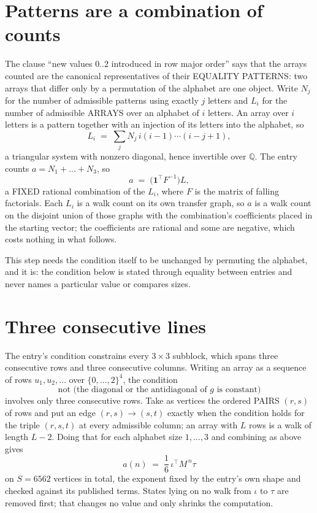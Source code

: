 \documentclass[11pt,a4paper]{article}
\theoremstyle{plain}
\theoremstyle{definition}
\begin{document}
\section{Patterns are a combination of counts}

The clause ``new values $0..2$ introduced in row major order'' says that the arrays
counted are the canonical representatives of their EQUALITY PATTERNS: two arrays that differ
only by a permutation of the alphabet are one object. Write $N_j$ for the number of admissible
patterns using exactly $j$ letters and $L_i$ for the number of admissible ARRAYS over an
alphabet of $i$ letters. An array over $i$ letters is a pattern together with an injection of
its letters into the alphabet, so
\[
L_i\;=\;\sum_{j}N_j\,i(i-1)\cdots(i-j+1),
\]
a triangular system with nonzero diagonal, hence invertible over $\mathbb{Q}$. The entry
counts $a=N_1+\dots+N_{3}$, so
\[
a\;=\;\bigl(\mathbf{1}^{\!\top}F^{-1}\bigr)L ,
\]
a FIXED rational combination of the $L_i$, where $F$ is the matrix of falling factorials.
Each $L_i$ is a walk count on its own transfer graph, so $a$ is a walk count on the disjoint
union of those graphs with the combination's coefficients placed in the starting vector; the
coefficients are rational and some are negative, which costs nothing in what follows.

This step needs the condition itself to be unchanged by permuting the alphabet, and it is:
the condition below is stated through equality between entries and never names a particular
value or compares sizes.

\section{Three consecutive lines}

The entry's condition constrains every $3\times3$ subblock, which spans three consecutive
rows and three consecutive columns. Writing an array as a sequence of rows
$u_1,u_2,\dots$ over $\{0,\dots,2\}^{4}$, the condition
\[
\text{not }\bigl(\text{the diagonal or the antidiagonal of }g\text{ is constant}\bigr)
\]
involves only three consecutive rows. Take as vertices the ordered PAIRS $(r,s)$ of
rows and put an edge $(r,s)\to(s,t)$ exactly when the condition holds for the triple
$(r,s,t)$ at every admissible column; an array with $L$ rows is a walk of length $L-2$.
Doing that for each alphabet size $1,\dots,3$ and combining as above gives
\[
a(n)\;=\;\frac{1}{6}\,\iota^{\!\top}M^{\,n}\tau
\]
on $S=6562$ vertices in total, the exponent fixed by the entry's own shape and checked against
its published terms. States lying on no walk from $\iota$ to $\tau$ are removed first; that
changes no value and only shrinks the computation.
\end{document}

